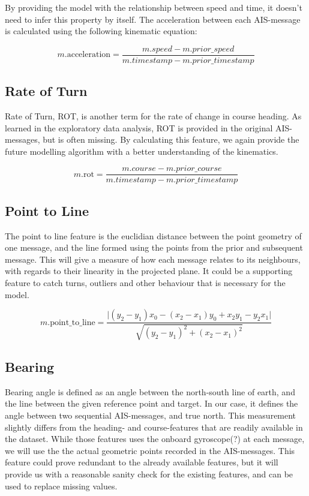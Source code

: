 By providing the model with the relationship between speed and time, it doesn't need to infer this property by itself. The acceleration between each AIS-message is calculated using the following kinematic equation:

$$
	m.\mathrm{acceleration} = \dfrac{m.speed - m.prior\_speed }{m.timestamp - m.prior\_timestamp}
$$


\subsection{Rate of Turn}

Rate of Turn, ROT,  is another term for the rate of change in course heading. As learned in the exploratory data analysis, ROT is provided in the original AIS-messages, but is often missing. By calculating this feature, we again provide the future modelling algorithm with a better understanding of the kinematics.

$$
	m.\mathrm{rot} = \dfrac{m.course - m.prior\_course }{m.timestamp - m.prior\_timestamp}
$$

\subsection{Point to Line}

The point to line feature is the euclidian distance between the point geometry of one message, and the line formed using the points from the prior and subsequent message. This will give a measure of how each message relates to its neighbours, with regards to their linearity in the projected plane. It could be a supporting feature to catch turns, outliers and other behaviour that is necessary for the model.


$$
	m.\mathrm{point\_to\_line} =  \dfrac{\lvert (y_2-y_1)x_0-(x_2-x_1)y_0+x_2y_1-y_2x_1\lvert}{\sqrt{(y_2-y_1)^2+(x_2-x_1)^2}}
$$

\subsection{Bearing}
Bearing angle is defined as an angle between the north-south line of earth, and the line between the given reference point and target. In our case, it defines the angle between two sequential AIS-messages, and true  north. This measurement slightly differs from the heading- and course-features that are readily available in the dataset. While those features uses the onboard gyroscope(?) at each message, we will use the the actual geometric points recorded in the AIS-messages. This feature could prove redundant to the already available features, but it will provide us with a reasonable sanity check for the existing features, and can be used to replace missing values.

